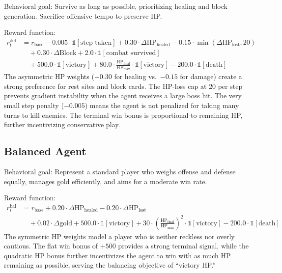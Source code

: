 Behavioral goal: Survive as long as possible, prioritizing healing and block generation. Sacrifice offensive tempo to preserve HP.

Reward function:
\begin{align}
r_t^{\text{def}} &= r_{\text{base}} - 0.005 \cdot \mathbb{1}[\text{step taken}] + 0.30 \cdot \Delta\text{HP}_{\text{healed}} - 0.15 \cdot \min(\Delta\text{HP}_{\text{lost}}, 20) \nonumber \\
&\quad + 0.30 \cdot \Delta\text{Block} + 2.0 \cdot \mathbb{1}[\text{combat survived}] \nonumber \\
&\quad + 500.0 \cdot \mathbb{1}[\text{victory}] + 80.0 \cdot \tfrac{\text{HP}_{\text{final}}}{\text{HP}_{\max}} \cdot \mathbb{1}[\text{victory}] - 200.0 \cdot \mathbb{1}[\text{death}]
\end{align}
The asymmetric HP weights ($+0.30$ for healing vs.\ $-0.15$ for damage) create a strong preference for rest sites and block cards. The HP-loss cap at 20 per step prevents gradient instability when the agent receives a large boss hit. The very small step penalty ($-0.005$) means the agent is not penalized for taking many turns to kill enemies. The terminal win bonus is proportional to remaining HP, further incentivizing conservative play.

\subsection{Balanced Agent}

Behavioral goal: Represent a standard player who weighs offense and defense equally, manages gold efficiently, and aims for a moderate win rate.

Reward function:
\begin{align}
r_t^{\text{bal}} &= r_{\text{base}} + 0.20 \cdot \Delta\text{HP}_{\text{healed}} - 0.20 \cdot \Delta\text{HP}_{\text{lost}} \nonumber \\
&\quad + 0.02 \cdot \Delta\text{gold} + 500.0 \cdot \mathbb{1}[\text{victory}] + 30 \cdot \left(\frac{\text{HP}_{\text{final}}}{\text{HP}_{\text{max}}}\right)^2 \cdot \mathbb{1}[\text{victory}] - 200.0 \cdot \mathbb{1}[\text{death}]
\end{align}
The symmetric HP weights model a player who is neither reckless nor overly cautious. The flat win bonus of $+500$ provides a strong terminal signal, while the quadratic HP bonus further incentivizes the agent to win with as much HP remaining as possible, serving the balancing objective of ``victory HP.''


